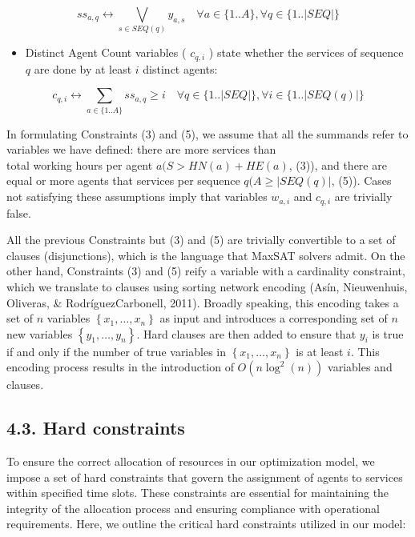 \documentclass[10pt]{article}
\begin{document}
\begin{equation*}
s s_{a, q} \leftrightarrow \bigvee_{s \in S E Q(q)} y_{a, s} \quad \forall a \in\{1 . . A\}, \forall q \in\{1 . .|S E Q|\} \tag{5}
\end{equation*}


\begin{itemize}
  \item Distinct Agent Count variables ( $c_{q, i}$ ) state whether the services of sequence $q$ are done by at least $i$ distinct agents:
\end{itemize}


\begin{equation*}
c_{q, i} \leftrightarrow \sum_{a \in\{1 . . A\}} s s_{a, q} \geq i \quad \forall q \in\{1 . .|S E Q|\}, \forall i \in\{1 . .|S E Q(q)|\} \tag{6}
\end{equation*}


In formulating Constraints (3) and (5), we assume that all the summands refer to variables we have defined: there are more services than\\
total working hours per agent $a(S>H N(a)+H E(a)$, (3)), and there are equal or more agents that services per sequence $q(A \geq|S E Q(q)|$, (5)). Cases not satisfying these assumptions imply that variables $w_{a, i}$ and $c_{q, i}$ are trivially false.

All the previous Constraints but (3) and (5) are trivially convertible to a set of clauses (disjunctions), which is the language that MaxSAT solvers admit. On the other hand, Constraints (3) and (5) reify a variable with a cardinality constraint, which we translate to clauses using sorting network encoding (Asín, Nieuwenhuis, Oliveras, \& RodríguezCarbonell, 2011). Broadly speaking, this encoding takes a set of $n$ variables $\left\{x_{1}, \ldots, x_{n}\right\}$ as input and introduces a corresponding set of $n$ new variables $\left\{y_{1}, \ldots, y_{n}\right\}$. Hard clauses are then added to ensure that $y_{i}$ is true if and only if the number of true variables in $\left\{x_{1}, \ldots, x_{n}\right\}$ is at least $i$. This encoding process results in the introduction of $O\left(n \log ^{2}(n)\right)$ variables and clauses.

\subsection*{4.3. Hard constraints}
To ensure the correct allocation of resources in our optimization model, we impose a set of hard constraints that govern the assignment of agents to services within specified time slots. These constraints are essential for maintaining the integrity of the allocation process and ensuring compliance with operational requirements. Here, we outline the critical hard constraints utilized in our model:
\end{document}
